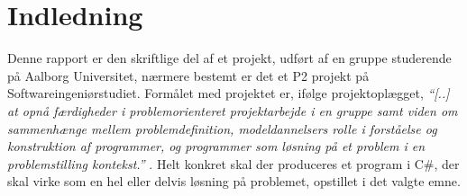 \chapter{Indledning}\label{chap:indledning}



Denne rapport er den skriftlige del af et projekt, udført af en gruppe studerende på Aalborg Universitet, nærmere bestemt er det et P2 projekt på Softwareingeniørstudiet. Formålet med projektet er, ifølge
projektoplægget, \textit{``[..] at opnå færdigheder i problemorienteret projektarbejde i en gruppe samt viden
om sammenhænge mellem problemdefinition, modeldannelsers rolle i forståelse og konstruktion af programmer, og
programmer som løsning på et problem i en problemstilling kontekst.''} \citep{projektkatalog}. Helt konkret skal der produceres et program i
C\#, der skal virke som en hel eller delvis løsning
på problemet, opstillet i det valgte emne.

